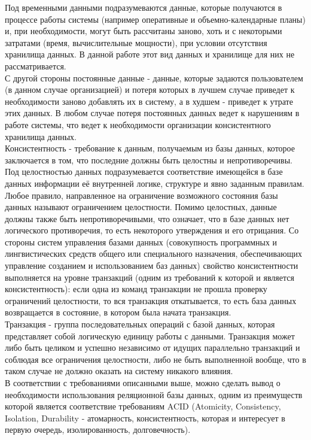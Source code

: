 \indent Под временными данными подразумеваются данные, которые получаются в процессе работы системы (например оперативные и объемно-календарные планы) и, при необходимости, могут быть рассчитаны заново, хоть и с некоторыми затратами (время, вычислительные мощности), при условии отсутствия хранилища данных.
В данной работе этот вид данных и хранилище для них не рассматривается.\\
\indent С другой стороны постоянные данные - данные, которые задаются пользователем (в данном случае организацией) и потеря которых в лучшем случае приведет к необходимости заново добавлять их в систему, а в худшем - приведет к утрате этих данных.
В любом случае потеря постоянных данных ведет к нарушениям в работе системы, что ведет к необходимости организации консистентного хранилища данных.\\
\indent Консистентность - требование к данным, получаемым из базы данных, которое заключается в том, что последние должны быть целостны и непротиворечивы.
Под целостностью данных подразумевается соответствие имеющейся в базе данных информации её внутренней логике, структуре и явно заданным правилам.
Любое правило, направленное на ограничение возможного состояния базы данных называют ограничением целостности.
Помимо целостных, данные должны также быть непротиворечивыми, что означает, что в базе данных нет логического противоречия, то есть некоторого утверждения и его отрицания.
Со стороны систем управления базами данных (совокупность программных и лингвистических средств общего или специального назначения, обеспечивающих управление созданием и использованием баз данных) свойство консистентности выполняется на уровне транзакций (одним из требований к которой и является консистентность): если одна из команд транзакции не прошла проверку ограничений целостности, то вся транзакция откатывается, то есть база данных возвращается в состояние, в котором была начата транзакция.\\
\indent Транзакция - группа последовательных операций с базой данных, которая представляет собой логическую единицу работы с данными.
Транзакция может либо быть целиком и успешно независимо от идущих параллельно транзакций и соблюдая все ограничения целостности, либо не быть выполненной вообще, что в таком случае не должно оказать на систему никакого влияния.\\
\indent В соответствии с требованиями описанными выше, можно сделать вывод о необходимости использования реляционной базы данных, одним из преимуществ которой является соответствие требованиям ACID (Atomicity, Consistency, Isolation, Durability - атомарность, консистентность, которая и интересует в первую очередь, изолированность, долговечность).

